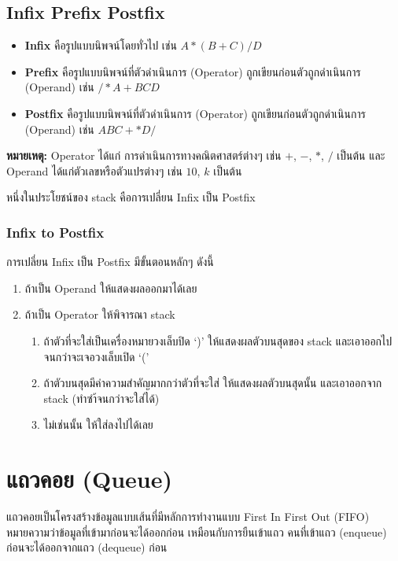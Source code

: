 \newpage

\subsection{Infix Prefix Postfix}

\begin{itemize}
\item \textbf{Infix} คือรูปแบบนิพจน์โดยทั่วไป เช่น $A * ( B + C ) / D$
\item \textbf{Prefix} คือรูปแบบนิพจน์ที่ตัวดำเนินการ (Operator) ถูกเขียนก่อนตัวถูกดำเนินการ (Operand) เช่น $/ * A + B C D$
\item \textbf{Postfix} คือรูปแบบนิพจน์ที่ตัวดำเนินการ (Operator) ถูกเขียนก่อนตัวถูกดำเนินการ (Operand) เช่น $A B C + * D /$
\end{itemize}

\textbf{หมายเหตุ:} Operator ได้แก่ การดำเนินการทางคณิตศาสตร์ต่างๆ เช่น $+$, $-$, $*$, $/$ เป็นต้น และ Operand ได้แก่ตัวเลขหรือตัวแปรต่างๆ เช่น $10$, $k$ เป็นต้น

หนึ่งในประโยชน์ของ stack คือการเปลี่ยน Infix เป็น Postfix

\subsubsection{Infix to Postfix}

การเปลี่ยน Infix เป็น Postfix มีขั้นตอนหลักๆ ดังนี้
\begin{enumerate}
\item ถ้าเป็น Operand ให้แสดงผลออกมาได้เลย
\item ถ้าเป็น Operator ให้พิจารณา stack
		\begin{enumerate}
\item ถ้าตัวที่จะใส่เป็นเครื่องหมายวงเล็บปิด `)' ให้แสดงผลตัวบนสุดของ stack และเอาออกไปจนกว่าจะเจอวงเล็บเปิด `('
\item ถ้าตัวบนสุดมีค่าความสำคัญมากกว่าตัวที่จะใส่ ให้แสดงผลตัวบนสุดนั้น และเอาออกจาก stack (ทำซำ้จนกว่าจะใส่ได้)
\item ไม่เช่นนั้น ให้ใส่ลงไปได้เลย
		\end{enumerate}
\end{enumerate}



\section{แถวคอย (Queue)}

แถวคอยเป็นโครงสร้างข้อมูลแบบเส้นที่มีหลักการทำงานแบบ First In First Out (FIFO) หมายความว่าข้อมูลที่เข้ามาก่อนจะได้ออกก่อน เหมือนกับการยืนเข้าแถว คนที่เข้าแถว (enqueue) ก่อนจะได้ออกจากแถว (dequeue) ก่อน

